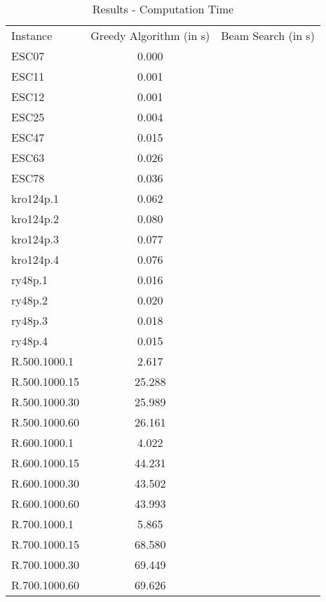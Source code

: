 \documentclass[]{article}
\begin{document}
	\begin{table}[htb]
		\begin{tabular}{lcc}
			Instance & Greedy Algorithm (in s) & Beam Search (in s) \\
			ESC07 & 0.000 & \\
			ESC11 & 0.001 & \\
			ESC12 & 0.001 & \\
			ESC25 & 0.004 & \\
			ESC47 & 0.015 & \\
			ESC63 & 0.026 & \\
			ESC78 & 0.036 & \\
			kro124p.1 & 0.062 & \\
			kro124p.2 & 0.080 & \\
			kro124p.3 & 0.077 & \\
			kro124p.4 & 0.076 & \\
			ry48p.1   & 0.016 & \\
			ry48p.2   & 0.020 & \\
			ry48p.3   & 0.018 & \\
			ry48p.4   & 0.015 & \\
			R.500.1000.1  & 2.617 & \\
			R.500.1000.15 & 25.288 & \\
			R.500.1000.30 & 25.989 & \\
			R.500.1000.60 & 26.161 & \\
			R.600.1000.1  & 4.022 & \\
			R.600.1000.15 & 44.231 & \\
			R.600.1000.30 & 43.502 & \\
			R.600.1000.60 & 43.993 & \\
			R.700.1000.1  & 5.865 & \\
			R.700.1000.15 & 68.580 & \\
			R.700.1000.30 & 69.449 & \\
			R.700.1000.60 & 69.626 & \\
		\end{tabular}
		\caption{Results - Computation Time}
		\label{table:results_time}
	\end{table}





    \newpage

	 
	
\end{document}
